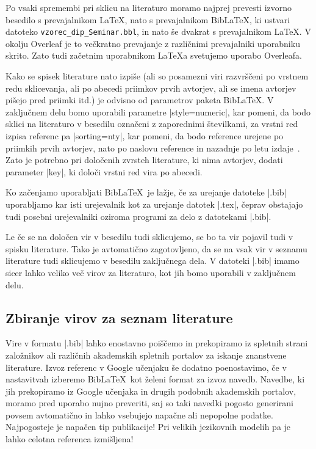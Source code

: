 \documentclass[9pt]{style/friteza}
\begin{document}
Po vsaki spremembi pri sklicu na literaturo moramo najprej prevesti izvorno besedilo s prevajalnikom \LaTeX, nato s prevajalnikom  Bib\LaTeX, ki ustvari datoteko  {\tt vzorec\_dip\_Seminar.bbl}, in nato še dvakrat s prevajalnikom  \LaTeX.
V okolju Overleaf je to večkratno prevajanje z različnimi prevajalniki uporabniku skrito. Zato tudi začetnim uporabnikom \LaTeX a svetujemo uporabo Overleafa.

Kako se spisek literature nato izpiše (ali so posamezni viri razvrščeni po vrstnem redu sklicevanja, ali po abecedi priimkov prvih avtorjev, ali se imena avtorjev pišejo pred priimki itd.) je odvisno od parametrov paketa Bib\LaTeX.
V zaključnem delu bomo uporabili parametre
\ltx|style=numeric|, kar pomeni, da bodo sklici na literaturo v besedilu označeni z zaporednimi številkami, za vrstni red izpisa referenc pa
\ltx|sorting=nty|, kar pomeni, da bodo reference urejene po priimkih prvih avtorjev, nato po naslovu reference in nazadnje po letu izdaje~\cite{ctan}.
Zato je potrebno pri določenih zvrsteh literature, ki nima avtorjev, dodati parameter \ltx|key|, ki določi vrstni red vira po abecedi.

Ko začenjamo uporabljati Bib\LaTeX\ je lažje, če za urejanje datoteke \ltx|.bib| uporabljamo kar isti urejevalnik kot za urejanje datotek \ltx|.tex|,
čeprav obstajajo tudi posebni urejevalniki oziroma programi za delo z datotekami \ltx|.bib|.

Le če se  na določen vir v besedilu tudi sklicujemo, se bo ta vir pojavil tudi v spisku literature.
Tako je avtomatično zagotovljeno, da se na vsak vir v seznamu literature tudi sklicujemo v besedilu zaključnega dela.
V datoteki \ltx|.bib| imamo sicer lahko veliko več virov za literaturo, kot jih bomo uporabili v zaključnem delu.

\subsection{Zbiranje virov za seznam literature}

Vire v formatu \ltx|.bib| lahko enostavno poiščemo in prekopiramo iz spletnih strani založnikov ali različnih akademskih spletnih portalov za iskanje znanstvene literature.
Izvoz  referenc v Google učenjaku še dodatno poenostavimo, če v nastavitvah izberemo Bib\LaTeX\ kot želeni format za izvoz navedb. Navedbe, ki jih  prekopiramo iz Google učenjaka in drugih podobnih akademskih portalov, moramo pred uporabo nujno preveriti, saj so taki navedki pogosto generirani povsem avtomatično in lahko vsebujejo napačne ali nepopolne podatke. Najpogosteje je napačen tip publikacije! Pri velikih jezikovnih modelih pa je lahko celotna referenca izmišljena!
\end{document}
